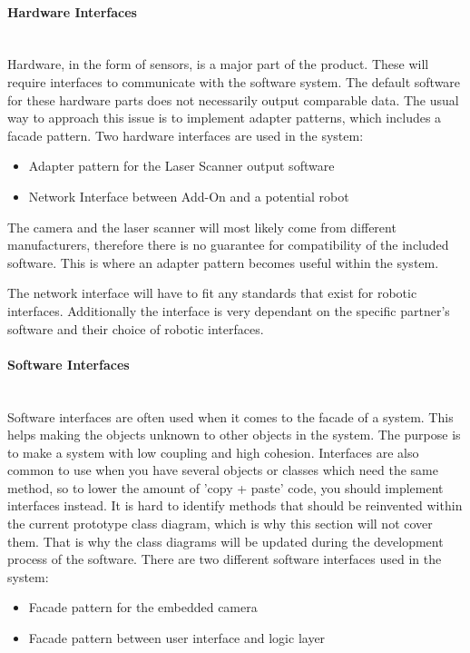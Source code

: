 \paragraph*{Hardware Interfaces}~\\
Hardware, in the form of sensors, is a major part of the product. These will require interfaces to communicate with the software system. The default software for these hardware parts does not necessarily output comparable data. The usual way to approach this issue is to implement adapter patterns, which includes a facade pattern. Two hardware interfaces are used in the system:

\begin{itemize}

\item Adapter pattern for the Laser Scanner output software
\item Network Interface between Add-On and a potential robot

\end{itemize}

The camera and the laser scanner will most likely come from different manufacturers, therefore there is no guarantee for compatibility of the included software. This is where an adapter pattern becomes useful within the system.

The network interface will have to fit any standards that exist for robotic interfaces. Additionally the interface is very dependant on the specific partner's software and their choice of robotic interfaces.
\paragraph*{Software Interfaces}~\\
Software interfaces are often used when it comes to the facade of a system. This helps making the objects unknown to other objects in the system. The purpose is to make a system with low coupling and high cohesion. Interfaces are also common to use when you have several objects or classes which need the same method, so to lower the amount of 'copy + paste' code, you should implement interfaces instead. It is hard to identify methods that should be reinvented within the current prototype class diagram, which is why this section will not cover them. That is why the class diagrams will be updated during the development process of the software. There are two different software interfaces used in the system:

\begin{itemize}

\item Facade pattern for the embedded camera
\item Facade pattern between user interface and logic layer

\end{itemize}

